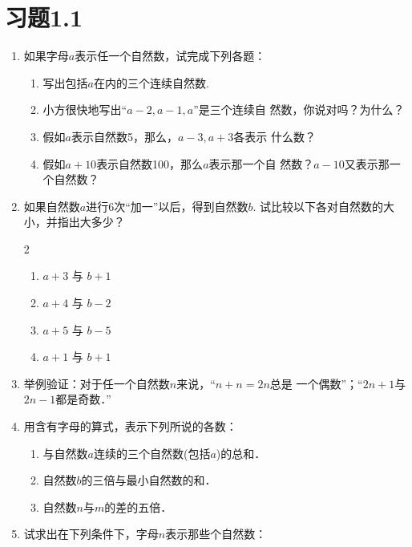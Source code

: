 \section*{习题1.1}

\begin{enumerate}
\item 如果字母$a$表示任一个自然数，试完成下列各题：
    \begin{enumerate}
        \item 写出包括$a$在内的三个连续自然数.
        \item 小方很快地写出“$a-2, a-1, a$”是三个连续自
  然数，你说对吗？为什么？
  \item 假如$a$表示自然数5，那么，$a-3,a+3$各表示
  什么数？
  \item 假如$a+10$表示自然数100，那么$a$表示那一个自
  然数？$a-10$又表示那一个自然数？
  
    \end{enumerate}

\item  如果自然数$a$进行6次“加一”以后，得到自然数$b$.
试比较以下各对自然数的大小，并指出大多少？
   \begin{multicols}{2}
\begin{enumerate}
    \item $a+3$ 与 $b+1$
    \item $a+4$ 与 $b-2$
    \item $a+5$ 与 $b-5$
    \item $a+1$ 与 $b+1$
\end{enumerate}
\end{multicols}

\item  举例验证：对于任一个自然数$n$来说，“$n+n=2n$总是
一个偶数”；“$2n + 1$与$2n-1$都是奇数．”

\item 用含有字母的算式，表示下列所说的各数：
\begin{enumerate}
    \item 与自然数$a$连续的三个自然数(包括$a$)的总和．
    \item 自然数$b$的三倍与最小自然数的和．
    \item 自然数$n$与$m$的差的五倍．
\end{enumerate}

\item 试求出在下列条件下，字母$n$表示那些个自然数：
\begin{enumerate}
\end{enumerate}


\end{enumerate}

